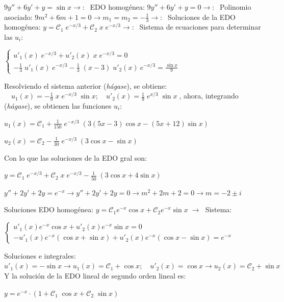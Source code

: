 \begin{ejem}
$9y''+6y'+y=\sin x \to : \; $ EDO homogénea: $9y''+6y'+y=0 \to :\; $  Polinomio asociado: $9m^2+6m+1=0 \to m_1=m_2=-\frac 1 3 \to : \; $ Soluciones de la EDO homogénea: $y=\mathcal{C}_1 \; e^{-x/3} + \mathcal{C}_2 \; x \; e^{-x/3} \to :\; $	Sistema de ecuaciones para determinar las $u_i$:

$\begin{cases}
u'_1(x)\; e^{-x/3} + u'_2(x) \; x \; e^{-x/3} = 0 \\
-\frac 1 3 \; u'_1(x)\; e^{-x/3} - \frac 1 3 \; (x-3)\;  u'_2(x)\ e^{-x/3} = \frac {\sin x}{9} 	
\end{cases}$

Resolviendo el sistema anterior (\emph{hágase}), se obtiene:
$\quad u_1(x)=-\frac 1 9 \; x \; e^{-x/3}\; \sin x ; \quad  u'_2(x)= \frac 1 9 \; e^{x/3} \; \sin x\; $, ahora, integrando (\emph{hágase}), se obtienen las funciones $u_i$:

$u_1(x)=\mathcal{C}_1+\frac 1 {150}\;  e^{-x/3} \; \left( 3(5x-3)\cos x -(5x+12)\sin x \right)\;$

$u_2(x)=\mathcal{C}_2 - \frac 1 {30} \; e^{-x/3}\; (3\cos x-\sin x)$

Con lo que las soluciones de la EDO gral son:

\hspace{30mm} $y=\mathcal{C}_1 \; e^{-x/3}+\mathcal{C}_2 \; x \; e^{-x/3}- \frac 1 {50} \; (3\cos x + 4 \sin x)$

\end{ejem}


\begin{ejem}
	$y''+2y'+2y=e^{-x} \to y''+2y'+2y=0 \to m^2+2m+2=0 \to m=-2 \pm i$

Soluciones EDO homogénea: $y=\mathcal{C}_1 e^{-x} \cos x + \mathcal{C}_2 e^{-x} \sin x \; \to \; $ Sistema:

$\begin{cases}
u'_1(x)e^{-x} \cos x + u'_2(x) e^{-x} \sin x = 0 \\
-u'_1(x) e^{-x} (\cos x + \sin x ) + u'_2(x) e^{-x} (\cos x - \sin x )=e^{-x}	
\end{cases}$

Soluciones e integrales: $u'_1(x)=-\sin x \to u_1(x)=\mathcal{C}_1 + \cos x ; \quad u'_2(x)=\cos x \to u_2(x)=\mathcal{C}_2 +\sin x$ Y la solución de la EDO lineal de segundo orden lineal es:

\hspace{30mm} $y=e^{-x}\cdot \left( 1+ \mathcal{C}_1 \; \cos x + \mathcal{C}_2 \; \sin x \right)$ 


\end{ejem}

